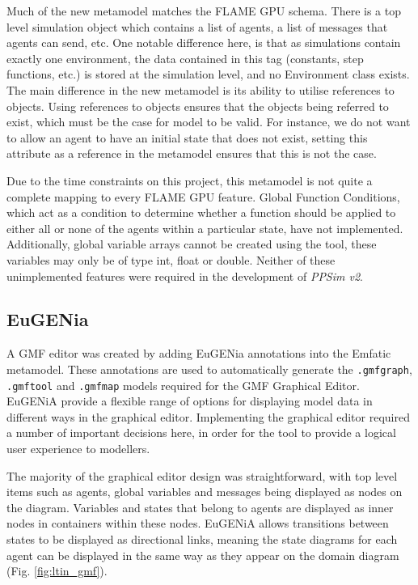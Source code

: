 \documentclass{UoYCSproject}
\begin{document}
Much of the new metamodel matches the \gls{FLAME GPU} schema.
There is a top level simulation object which contains a list of agents, a list of messages that agents can send, etc.
One notable difference here, is that as simulations contain exactly one environment, the data contained in this tag (constants, step functions, etc.) is stored at the simulation level, and no Environment class exists.
The main difference in the new metamodel is its ability to utilise references to objects.
Using references to objects ensures that the objects being referred to exist, which must be the case for model to be valid.
For instance, we do not want to allow an agent to have an initial state that does not exist, setting this attribute as a reference in the metamodel ensures that this is not the case.

Due to the time constraints on this project, this metamodel is not quite a complete mapping to every \gls{FLAME GPU} feature.
Global Function Conditions, which act as a condition to determine whether a function should be applied to either all or none of the agents within a particular state, have not implemented.
Additionally, global variable arrays cannot be created using the tool, these variables may only be of type int, float or double.
Neither of these unimplemented features were required in the development of \textit{PPSim v2}.

\subsection{EuGENia}
A GMF editor was created by adding EuGENia annotations into the Emfatic metamodel.
These annotations are used to automatically generate the \texttt{.gmfgraph}, \texttt{.gmftool} and \texttt{.gmfmap} models required for the GMF Graphical Editor.
EuGENiA provide a flexible range of options for displaying model data in different ways in the graphical editor\cite{epsilon_book}.
Implementing the graphical editor required a number of important decisions here, in order for the tool to provide a logical user experience to modellers.

The majority of the graphical editor design was straightforward, with top level items such as agents, global variables and messages being displayed as nodes on the diagram.
Variables and states that belong to agents are displayed as inner nodes in containers within these nodes.
EuGENiA allows transitions between states to be displayed as directional links, meaning the state diagrams for each agent can be displayed in the same way as they appear on the domain diagram (Fig. \ref{fig:ltin_gmf}).
\end{document}
